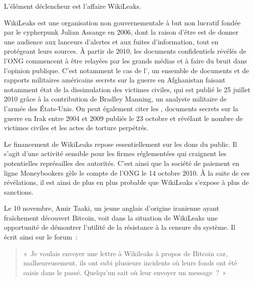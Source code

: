 
L'élément déclencheur est l'affaire WikiLeaks.

WikiLeaks est une organisation non gouvernementale à but non lucratif fondée par le cypherpunk Julian Assange en 2006, dont la raison d'être est de donner une audience aux lanceurs d'alertes et aux fuites d'information, tout en protégeant leurs sources. À partir de 2010, les documents confidentiels révélés de l'ONG commencent à être relayées par les grands médias et à faire du bruit dans l'opinion publique. C'est notamment le cas de l', un ensemble de documents et de rapports militaires américains secrets sur la guerre en Afghanistan faisant notamment état de la dissimulation des victimes civiles, qui est publié le 25 juillet 2010 grâce à la contribution de Bradley Manning, un analyste militaire de l'armée des États-Unis. On peut également citer les , documents secrets sur la guerre en Irak entre 2004 et 2009 publiés le 23 octobre et révélant le nombre de victimes civiles et les actes de torture perpétrés. %

Le financement de WikiLeaks repose essentiellement sur les dons du public. Il s'agit d'une activité sensible pour les firmes réglementées qui craignent les potentielles représailles des autorités. C'est ainsi que la société de paiement en ligne Moneybookers gèle le compte de l'ONG le 14 octobre 2010. À la suite de ces révélations, il est ainsi de plus en plus probable que WikiLeaks s'expose à plus de sanctions.

Le 10 novembre, Amir Taaki, un jeune anglais d'origine iranienne ayant fraîchement découvert Bitcoin, voit dans la situation de WikiLeaks une opportunité de démontrer l'utilité de la résistance à la censure du système. Il écrit ainsi sur le forum~:

\begin{quote}
«~Je voulais envoyer une lettre à Wikileaks à propos de Bitcoin car, malheureusement, ils ont subi plusieurs incidents où leurs fonds ont été saisis dans le passé. Quelqu'un sait où leur envoyer un message~?~»
\end{quote}

